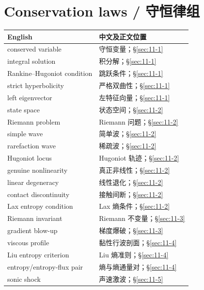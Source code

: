 \section*{Conservation laws / 守恒律组}
\begin{center}\small
\begin{tabular}{@{}p{.53\linewidth}p{.38\linewidth}@{}}
\textbf{English}&\textbf{中文及正文位置}\\\hline
conserved variable & 守恒变量；\S\ref{sec:11-1}\\
integral solution & 积分解；\S\ref{sec:11-1}\\
Rankine--Hugoniot condition & 跳跃条件；\S\ref{sec:11-1}\\
strict hyperbolicity & 严格双曲性；\S\ref{sec:11-1}\\
left eigenvector & 左特征向量；\S\ref{sec:11-1}\\
state space & 状态空间；\S\ref{sec:11-2}\\
Riemann problem & Riemann 问题；\S\ref{sec:11-2}\\
simple wave & 简单波；\S\ref{sec:11-2}\\
rarefaction wave & 稀疏波；\S\ref{sec:11-2}\\
Hugoniot locus & Hugoniot 轨迹；\S\ref{sec:11-2}\\
genuine nonlinearity & 真正非线性；\S\ref{sec:11-2}\\
linear degeneracy & 线性退化；\S\ref{sec:11-2}\\
contact discontinuity & 接触间断；\S\ref{sec:11-2}\\
Lax entropy condition & Lax 熵条件；\S\ref{sec:11-2}\\
Riemann invariant & Riemann 不变量；\S\ref{sec:11-3}\\
gradient blow-up & 梯度爆破；\S\ref{sec:11-3}\\
viscous profile & 黏性行波剖面；\S\ref{sec:11-4}\\
Liu entropy criterion & Liu 熵准则；\S\ref{sec:11-4}\\
entropy/entropy-flux pair & 熵与熵通量对；\S\ref{sec:11-4}\\
sonic shock & 声速激波；\S\ref{sec:11-5}
\end{tabular}
\end{center}
\clearpage
